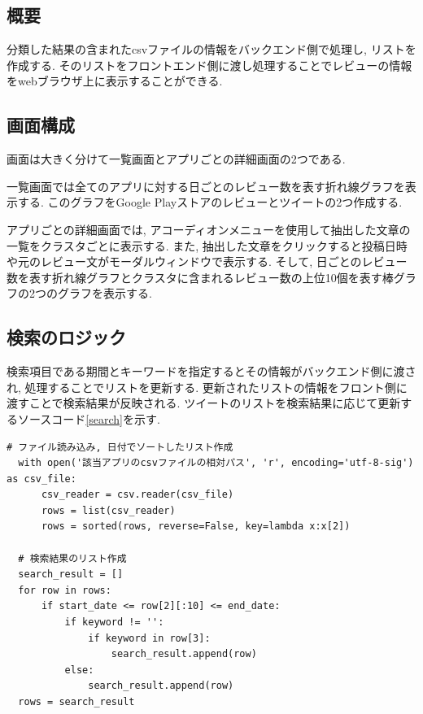 \subsection{概要}
分類した結果の含まれたcsvファイルの情報をバックエンド側で処理し, リストを作成する. そのリストをフロントエンド側に渡し処理することでレビューの情報をwebブラウザ上に表示することができる. 

\subsection{画面構成}
画面は大きく分けて一覧画面とアプリごとの詳細画面の2つである. 

一覧画面では全てのアプリに対する日ごとのレビュー数を表す折れ線グラフを表示する. 
このグラフをGoogle Playストアのレビューとツイートの2つ作成する. 

アプリごとの詳細画面では, アコーディオンメニューを使用して抽出した文章の一覧をクラスタごとに表示する. また, 抽出した文章をクリックすると投稿日時や元のレビュー文がモーダルウィンドウで表示する. 
そして, 日ごとのレビュー数を表す折れ線グラフとクラスタに含まれるレビュー数の上位10個を表す棒グラフの2つのグラフを表示する. 

\subsection{検索のロジック}
検索項目である期間とキーワードを指定するとその情報がバックエンド側に渡され, 処理することでリストを更新する. 更新されたリストの情報をフロント側に渡すことで検索結果が反映される. 
ツイートのリストを検索結果に応じて更新するソースコード\ref{search}を示す. 

\begin{lstlisting}[caption=view.py, label=search]
  # ファイル読み込み, 日付でソートしたリスト作成
  with open('該当アプリのcsvファイルの相対パス', 'r', encoding='utf-8-sig') as csv_file:
      csv_reader = csv.reader(csv_file)
      rows = list(csv_reader)
      rows = sorted(rows, reverse=False, key=lambda x:x[2])

  # 検索結果のリスト作成
  search_result = []
  for row in rows:
      if start_date <= row[2][:10] <= end_date:
          if keyword != '':
              if keyword in row[3]:
                  search_result.append(row)
          else:
              search_result.append(row)
  rows = search_result
\end{lstlisting}

